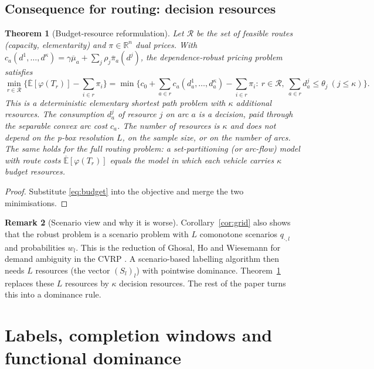 \documentclass[11pt]{article}
\newtheorem{theorem}{Theorem}[section]
\theoremstyle{definition}
\newtheorem{remark}[theorem]{Remark}
\newcommand{\R}{\mathbb{R}}
\newcommand{\Eu}{\overline{\mathbb{E}}}
\newcommand{\pib}{\overline{\pi}}
\newcommand{\mub}{\overline{\mu}}
\newcommand{\cR}{\mathcal{R}}
\begin{document}
\subsection{Consequence for routing: decision resources}

\begin{theorem}[Budget-resource reformulation]\label{thm:resource}
Let $\cR$ be the set of feasible routes (capacity, elementarity) and $\pi\in\R^n$ dual prices. With $c_a(d^1,\dots,d^\kappa)=\gamma\mub_a+\sum_j\rho_j\pib_a(d^j)$, the dependence-robust pricing problem satisfies
\[
\min_{r\in\cR}\Big\{\Eu[\varphi(T_r)]-\sum_{i\in r}\pi_i\Big\}
=\min\Big\{c_0+\sum_{a\in r}c_a(d^1_a,\dots,d^\kappa_a)-\sum_{i\in r}\pi_i:\ r\in\cR,\ \sum_{a\in r}d^j_a\le\theta_j\ (j\le\kappa)\Big\}.
\]
This is a deterministic elementary shortest path problem with $\kappa$ additional resources. The consumption $d^j_a$ of resource $j$ on arc $a$ is a decision, paid through the separable convex arc cost $c_a$. The number of resources is $\kappa$ and does not depend on the p-box resolution $L$, on the sample size, or on the number of arcs.
The same holds for the full routing problem: a set-partitioning (or arc-flow) model with route costs $\Eu[\varphi(T_r)]$ equals the model in which each vehicle carries $\kappa$ budget resources.
\end{theorem}
\begin{proof}
Substitute \eqref{eq:budget} into the objective and merge the two minimisations.
\end{proof}

\begin{remark}[Scenario view and why it is worse]
Corollary~\ref{cor:grid} also shows that the robust problem is a scenario problem with $L$ comonotone scenarios $q_{\cdot,l}$ and probabilities $w_l$. This is the reduction of Ghosal, Ho and Wiesemann for demand ambiguity in the CVRP \cite{GHW24}. A scenario-based labelling algorithm then needs $L$ resources (the vector $(S_l)_l$) with pointwise dominance. Theorem~\ref{thm:resource} replaces these $L$ resources by $\kappa$ decision resources. The rest of the paper turns this into a dominance rule.
\end{remark}

\section{Labels, completion windows and functional dominance}\label{sec:dom}
\end{document}
